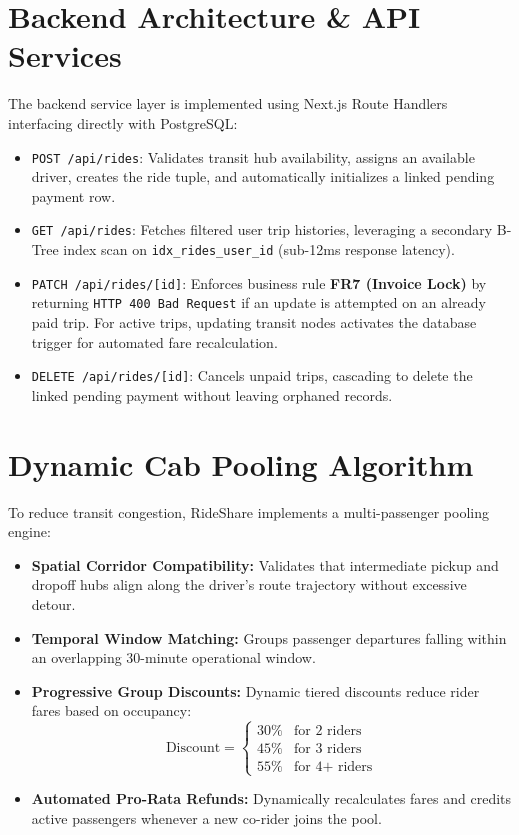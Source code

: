 \section{Backend Architecture \& API Services}
The backend service layer is implemented using Next.js Route Handlers interfacing directly with PostgreSQL:
\begin{itemize}[itemsep=1.5pt, topsep=2pt, parsep=0pt]
    \item \texttt{POST /api/rides}: Validates transit hub availability, assigns an available driver, creates the ride tuple, and automatically initializes a linked pending payment row.
    \item \texttt{GET /api/rides}: Fetches filtered user trip histories, leveraging a secondary B-Tree index scan on \texttt{idx\_rides\_user\_id} (sub-12ms response latency).
    \item \texttt{PATCH /api/rides/[id]}: Enforces business rule \textbf{FR7 (Invoice Lock)} by returning \texttt{HTTP 400 Bad Request} if an update is attempted on an already paid trip. For active trips, updating transit nodes activates the database trigger for automated fare recalculation.
    \item \texttt{DELETE /api/rides/[id]}: Cancels unpaid trips, cascading to delete the linked pending payment without leaving orphaned records.
\end{itemize}

\section{Dynamic Cab Pooling Algorithm}
To reduce transit congestion, RideShare implements a multi-passenger pooling engine:
\begin{itemize}[itemsep=1.5pt, topsep=2pt, parsep=0pt]
    \item \textbf{Spatial Corridor Compatibility:} Validates that intermediate pickup and dropoff hubs align along the driver's route trajectory without excessive detour.
    \item \textbf{Temporal Window Matching:} Groups passenger departures falling within an overlapping 30-minute operational window.
    \item \textbf{Progressive Group Discounts:} Dynamic tiered discounts reduce rider fares based on occupancy:
    $$\text{Discount} = \begin{cases} 
      30\% & \text{for 2 riders} \\
      45\% & \text{for 3 riders} \\
      55\% & \text{for 4+ riders}
   \end{cases}$$
    \item \textbf{Automated Pro-Rata Refunds:} Dynamically recalculates fares and credits active passengers whenever a new co-rider joins the pool.
\end{itemize}

